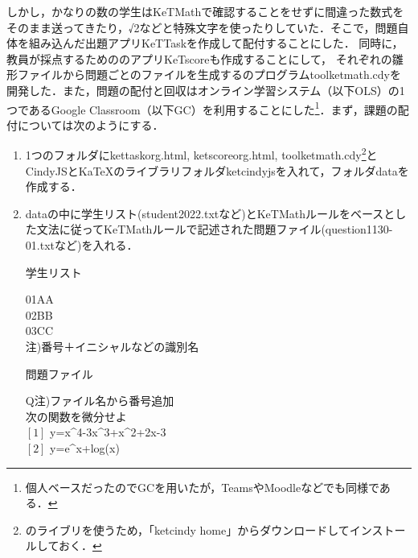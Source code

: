 \documentclass[a4j,12pt]{ujarticle}
\begin{document}
しかし，かなりの数の学生はKeTMathで確認することをせずに間違った数式をそのまま送ってきたり，√2などと特殊文字を使ったりしていた．そこで，問題自体を組み込んだ出題アプリKeTTaskを作成して配付することにした．
同時に，教員が採点するためののアプリKeTscoreも作成することにして，
それぞれの雛形ファイルから問題ごとのファイルを生成する\ketcindy のプログラムtoolketmath.cdyを開発した．また，問題の配付と回収はオンライン学習システム（以下OLS）の1つであるGoogle Classroom（以下GC）を利用することにした\footnote{個人ベースだったのでGCを用いたが，TeamsやMoodleなどでも同様である．}．まず，課題の配付については次のようにする．\vspace{-1mm}
\begin{enumerate}
\item 1つのフォルダにkettaskorg.html, ketscoreorg.html, toolketmath.cdy\footnote{\ketcindy のライブリを使うため，「ketcindy home」からダウンロードしてインストールしておく．}とCindyJSとKaTeXのライブラリフォルダketcindyjsを入れて，フォルダdataを作成する．\vspace{-2mm}
\item dataの中に学生リスト(student2022.txtなど)とKeTMathルールをベースとした文法に従ってKeTMathルールで記述された問題ファイル(question1130-01.txtなど)を入れる．\\
\begin{minipage}[t]{68mm}
\begin{center}
学生リスト
\end{center}
\hspace*{2zw}01AA\\
\hspace*{2zw}02BB\\
\hspace*{2zw}03CC\\
\hfill{\small 注)番号＋イニシャルなどの識別名}
\end{minipage}\hspace{6mm}%
\begin{minipage}[t]{68mm}
\begin{center}
問題ファイル
\end{center}
\hspace*{2zw}Q\hfill{\small 注)ファイル名から番号追加}\\
\hspace*{2zw}次の関数を微分せよ\\
\hspace*{2zw}$[1]$ y=x\^{}4-3x\^{}3+x\^{}2+2x-3\\
\hspace*{2zw}$[2]$ y=e{}\^{}x+log(x)\\

\end{minipage}
\end{enumerate}
\end{document}
